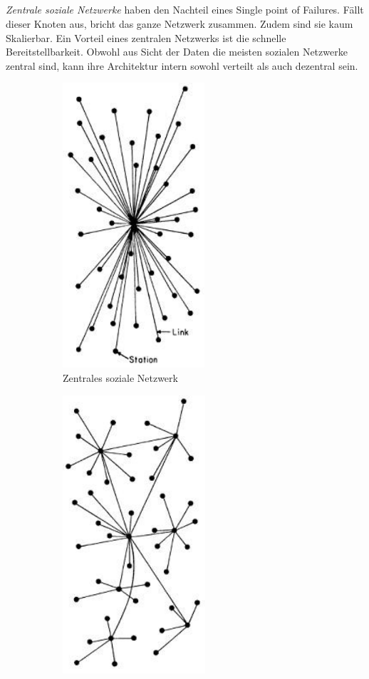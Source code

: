 	\subsection{
	}
	\label{sub:difference}
	\textit{Zentrale soziale Netzwerke} haben den Nachteil eines \glqq Single point of Failures\grqq. Fällt dieser Knoten aus, bricht das ganze Netzwerk zusammen. Zudem sind sie kaum Skalierbar. Ein Vorteil eines zentralen Netzwerks ist die schnelle Bereitstellbarkeit. Obwohl aus Sicht der Daten die meisten sozialen Netzwerke zentral sind, kann ihre Architektur intern sowohl verteilt als auch dezentral sein.\par
	
	\begin{figure}[!t] 
		\centering
		\begin{subfigure}[t]{0.4\linewidth}
			\centering
			\includegraphics[width=0.4\linewidth]{figures/centralized-network.png}
			\caption{Zentrales soziale Netzwerk}
			\label{fig:central-network}
		\end{subfigure}
		\begin{subfigure}[t]{0.4\linewidth}
			\centering
			\includegraphics[width=0.4\linewidth]{figures/decentralized-network.png}

\end{subfigure}
\end{figure}
